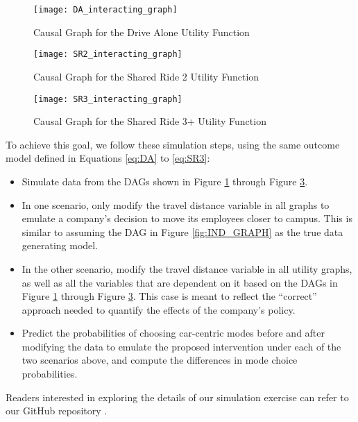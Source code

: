 \begin{figure}
   \centering
   \texttt{[image: DA\_interacting\_graph]}
   \caption{Causal Graph for the Drive Alone Utility Function}
   \label{fig:DA_causal_2}
\end{figure}

\begin{figure}
   \centering
   \texttt{[image: SR2\_interacting\_graph]}
   \caption{Causal Graph for the Shared Ride 2 Utility Function}
   \label{fig:SR2_causal_2}
\end{figure}

\begin{figure}
   \centering
   \texttt{[image: SR3\_interacting\_graph]}
   \caption{Causal Graph for the Shared Ride 3+ Utility Function}
   \label{fig:SR3_causal_2}
\end{figure}

To achieve this goal, we follow these simulation steps, using the same outcome model defined in Equations \ref{eq:DA} to \ref{eq:SR3}:
\begin{itemize}
   \item Simulate data from the DAGs shown in Figure \ref{fig:DA_causal_2} through Figure \ref{fig:SR3_causal_2}.
   \item In one scenario, only modify the travel distance variable in all graphs to emulate a company's decision to move its employees closer to campus. This is similar to assuming the DAG in Figure \ref{fig:IND_GRAPH} as the true data generating model.
   \item In the other scenario, modify the travel distance variable in all utility graphs, as well as all the variables that are dependent on it based on the DAGs in Figure \ref{fig:DA_causal_2} through Figure \ref{fig:SR3_causal_2}. This case is meant to reflect the ``correct'' approach needed to quantify the effects of the company's policy.
   \item Predict the probabilities of choosing car-centric modes before and after modifying the data to emulate the proposed intervention under each of the two scenarios above, and compute the differences in mode choice probabilities.
\end{itemize}

Readers interested in exploring the details of our simulation exercise can refer to our GitHub repository \citep{brathwaite_etal_2020}.


